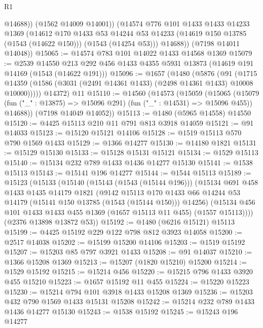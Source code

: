 \begin{lexlean}{R1}
\begin{coremodule}
              @14688))
          (@1562 @14009 @14001))
        (@14574
          @776
          @101
          @1433
          @1433
          @14233
          @1369
          (@14612
            @170
            @1433
            @53
            @14244
            @53
            @14233
            (@14619 @150 @13785 (@1543 (@14622 @150)))
            (@1543 (@14254 @53)))
          @14688))
      (@7198 @14011 @14048))
@15065 := @14574 @783 @101 @14022 @1433 @14568 @1369
@15079 := @2539
    @14550
    @213
    @292
    @456
    @1433
    @4355
    @5931
    @13873
    (@14619 @191 @14169 (@1543 (@14622 @191)))
@15096 := @1657
    (@1480
      (@5876
        (@91
          (@1715 @14359 (@1586 (@3031 (@2491 @14361 @1433) (@2498 @14361 @1433) @10008 @10000)))))
      @14372)
    @11
@15110 := @14560
    (@14573
      (@15059
        (@15065
          (@15079 (fun ("_" : @13875) => @15096 @291) (fun ("_" : @14531) => @15096 @455))
          @14688))
      (@7198 @14049 @14052))
@15113 := @1480 (@5965 @14558) @14550
@15120 := @4425 @15113 @210 @11 @791 @813 @3918 @14059
@15121 := @91 @14033
@15123 := @15120 @15121 @14106
@15128 := @1519 @15113 @570 @790 @1569 @1433
@15129 := @1366 @14277
@15130 := @14180 @1821
@15131 := @15129 @15130
@15133 := @15128 @15131 @15121
@15134 := @1529 @15113
@15140 := @15134 @232 @789 @1433 @1436 @14277 @15130
@15141 := @1538 @15113
@15143 := @15141 @196 @14277
@15144 := @1544 @15113
@15189 := @15123
    (@15133
      (@15140
        (@15143 (@1543 (@15144 @196)))
        (@15134
          @691
          @458
          @1433
          @1435
          @14179
          @1821
          (@9142
            @15113
            @170
            @1433
            @66
            @14244
            @53
            @14179
            (@15141 @150 @13785 (@1543 (@15144 @150)))
            @14256)
          (@15134 @456 @101 @1433 @1433 @455 @1369 (@1657 @15113 @11 @455) (@1557 @15113))))
      (@2376 @13898 @13872 @53))
@15192 := @1480 (@6216 @15121) @15113
@15199 := @4425 @15192 @229 @122 @798 @812 @3923 @14058
@15200 := @2517 @14038
@15202 := @15199 @15200 @14106
@15203 := @1519 @15192
@15207 := @15203 @85 @797 @3921 @1433
@15208 := @91 @14037
@15210 := @1366 @15208 @1369
@15213 := @15207 (@1820 @15210) @15200
@15214 := @1529 @15192
@15215 := @15214 @456
@15220 := @15215 @796 @1433 @3920 @455 @15210
@15223 := @1657 @15192 @11 @455
@15224 := @15220 @15223
@15230 := @15214 @794 @101 @3918 @1433 @15208 @1369
@15236 := @15203 @432 @790 @1569 @1433 @15131 @15208
@15242 := @15214 @232 @789 @1433 @1436 @14277 @15130
@15243 := @1538 @15192
@15245 := @15243 @196 @14277

\end{coremodule}
\end{lexlean}

